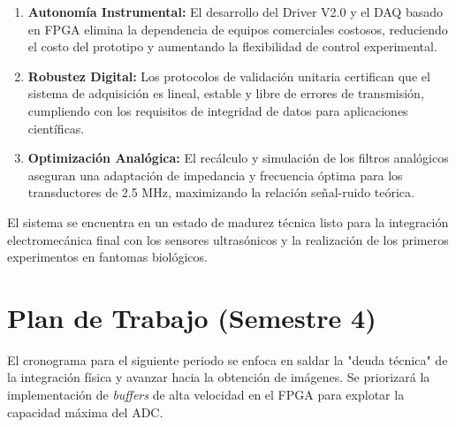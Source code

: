 \documentclass[12pt,letterpaper]{article}
\begin{document}
\begin{enumerate}
    \item \textbf{Autonomía Instrumental:} El desarrollo del Driver V2.0 y el DAQ basado en FPGA elimina la dependencia de equipos comerciales costosos, reduciendo el costo del prototipo y aumentando la flexibilidad de control experimental.
    \item \textbf{Robustez Digital:} Los protocolos de validación unitaria certifican que el sistema de adquisición es lineal, estable y libre de errores de transmisión, cumpliendo con los requisitos de integridad de datos para aplicaciones científicas.
    \item \textbf{Optimización Analógica:} El recálculo y simulación de los filtros analógicos aseguran una adaptación de impedancia y frecuencia óptima para los transductores de 2.5 MHz, maximizando la relación señal-ruido teórica.
\end{enumerate}

El sistema se encuentra en un estado de madurez técnica listo para la integración electromecánica final con los sensores ultrasónicos y la realización de los primeros experimentos en fantomas biológicos.

\section{Plan de Trabajo (Semestre 4)}

El cronograma para el siguiente periodo se enfoca en saldar la "deuda técnica" de la integración física y avanzar hacia la obtención de imágenes. Se priorizará la implementación de \textit{buffers} de alta velocidad en el FPGA para explotar la capacidad máxima del ADC.
\end{document}
